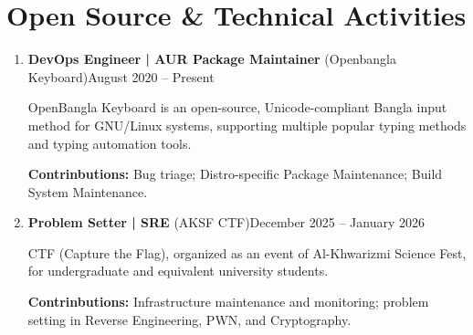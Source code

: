 \section{Open Source \& Technical Activities}
\begin{flushleft}

	\begin{enumerate}[noitemsep,topsep=0pt]
		\item \textbf{DevOps Engineer | AUR Package Maintainer} (Openbangla Keyboard)\hfill August 2020 -- Present

		OpenBangla Keyboard is an open-source, Unicode-compliant Bangla input method for GNU/Linux systems, supporting multiple popular typing methods and typing automation tools.

		\textbf{Contrinbutions:} Bug triage; Distro-specific Package Maintenance; Build System Maintenance.

		\item \textbf{Problem Setter | SRE } (AKSF CTF)\hfill December 2025 -- January 2026

		CTF (Capture the Flag), organized as an event of Al-Khwarizmi Science Fest, for undergraduate and equivalent university students.

		\textbf{Contrinbutions:} Infrastructure maintenance and monitoring; problem setting in Reverse Engineering, PWN, and Cryptography.
	\end{enumerate}

\end{flushleft}
